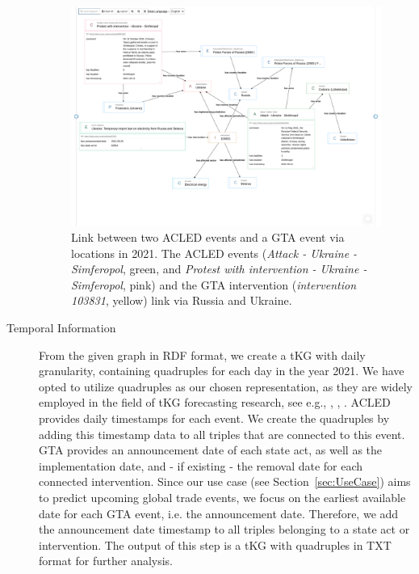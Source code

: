 \begin{description}
\begin{figure}
    \centering
    \includegraphics[clip, trim=1.1cm 5.0cm 1.2cm 1.8cm, width=1\textwidth]{figs/acled_gta.pdf}
    \caption{Link between two ACLED events and a GTA event via locations in 2021. The ACLED events (\textit{Attack - Ukraine - Simferopol}, green, and \textit{Protest with intervention - Ukraine - Simferopol}, pink) and the GTA intervention (\textit{intervention 103831}, yellow) link via Russia and Ukraine. }
    \label{fig:link}
\end{figure}

\item[Temporal Information] 
From the given graph in RDF format, we create a tKG with daily granularity, containing quadruples for each day in the year 2021. We have opted to utilize quadruples as our chosen representation, as they are widely employed in the field of tKG forecasting research, see e.g., \cite{Jin2019oldrenet}, \cite{Li2021regcn}, \cite{Han2021xerte}.
ACLED provides daily timestamps for each event. We create the quadruples by adding this timestamp data to all triples that are connected to this event. 
GTA provides an announcement date of each state act, as well as the implementation date, and - if existing - the removal date for each connected intervention. 
Since our use case (see Section~\ref{sec:UseCase}) aims to predict upcoming global trade events, we focus on the earliest available date for each GTA event, i.e. the announcement date. Therefore, we add the announcement date timestamp to all triples belonging to a state act or intervention. 
The output of this step is a tKG with quadruples in TXT format for further analysis. 
\end{description}
